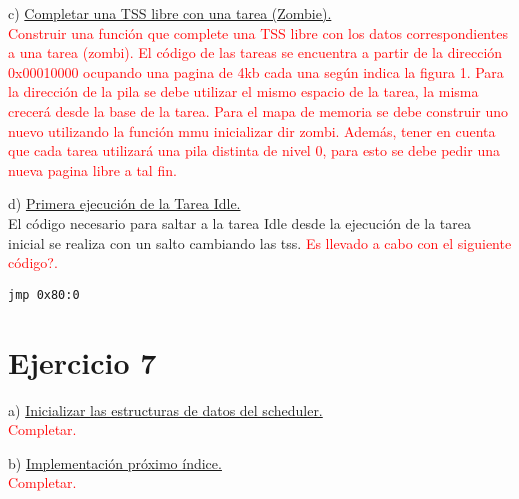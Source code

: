 \documentclass[a4paper]{article}
\begin{document}
{\large c)} \underline{Completar una TSS libre con una tarea (Zombie).}\\

\textcolor{red}{Construir una funci\'on que complete una TSS libre con los datos correspondientes a una
tarea (zombi). El c\'odigo de las tareas se encuentra a partir de la direcci\'on 0x00010000
ocupando una pagina de 4kb cada una seg\'un indica la figura 1. Para la direcci\'on de la
pila se debe utilizar el mismo espacio de la tarea, la misma crecer\'a desde la base de la tarea. 
Para el mapa de memoria se debe construir uno nuevo utilizando la funci\'on mmu inicializar dir zombi. 
Adem\'as, tener en cuenta que cada tarea utilizar\'a una pila distinta de nivel 0, para esto se debe pedir una nueva pagina libre a tal fin.} \\
\bigskip


{\large d)} \underline{Primera ejecuci\'on de la Tarea Idle.}\\

El c\'odigo necesario para saltar a la tarea Idle desde la ejecuci\'on de la tarea inicial se realiza con un salto cambiando las tss. \textcolor{red}{Es llevado a cabo con el siguiente c\'odigo?.}\\

\begin{codesnippet}
\begin{verbatim}
jmp 0x80:0
\end{verbatim}
\end{codesnippet}



\newpage
\section{Ejercicio 7}


{\large a)} \underline{Inicializar las estructuras de datos del scheduler.}\\

\textcolor{red}{Completar.}\\
\bigskip

{\large b)} \underline{Implementaci\'on pr\'oximo \'indice.}\\

\textcolor{red}{Completar.}\\
\bigskip
\end{document}
